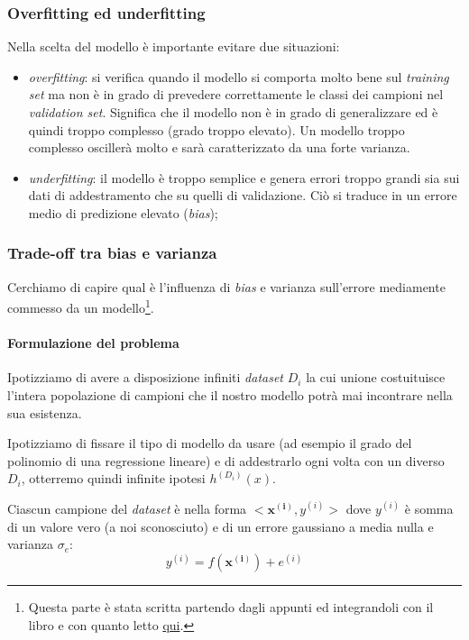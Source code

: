 \subsubsection{Overfitting ed underfitting}
Nella scelta del modello è importante evitare due situazioni:
\begin{itemize}
\item \emph{overfitting}: si verifica quando il modello si comporta molto bene sul \emph{training set} ma non è in grado di prevedere correttamente le classi dei campioni nel \emph{validation set}. Significa che il modello non è in grado di generalizzare ed è quindi troppo complesso (grado troppo elevato). Un modello troppo complesso oscillerà molto e sarà caratterizzato da una forte varianza.
\item \emph{underfitting}: il modello è troppo semplice e genera errori troppo grandi sia sui dati di addestramento che su quelli di validazione. Ciò si traduce in un errore medio di predizione elevato (\emph{bias});
\end{itemize}

\subsubsection{Trade-off tra bias e varianza}
Cerchiamo di capire qual è l'influenza di \emph{bias} e varianza sull'errore mediamente commesso da un modello\footnote{Questa parte è stata scritta partendo dagli appunti ed integrandoli con il libro e con quanto letto \href{http://www-scf.usc.edu/~csci567/17-18-bias-variance.pdf}{qui}.}.

\paragraph{Formulazione del problema}
Ipotizziamo di avere a disposizione infiniti \emph{dataset} $D_i$ la cui unione costuituisce l'intera popolazione di campioni che il nostro modello potrà mai incontrare nella sua esistenza.

Ipotizziamo di fissare il tipo di modello da usare (ad esempio il grado del polinomio di una regressione lineare) e di addestrarlo ogni volta con un diverso $D_i$, otterremo quindi infinite ipotesi $h^{(D_i)}(x)$.

Ciascun campione del \emph{dataset} è nella forma $<\mathbf{x^{(i)}}, y^{(i)}>$ dove $y^{(i)}$ è somma di un valore vero (a noi sconosciuto) e di un errore gaussiano a media nulla e varianza $\sigma_e$:
\begin{equation*}
y^{(i)}=f(\mathbf{x^{(i)}})+e^{(i)}
\end{equation*}


